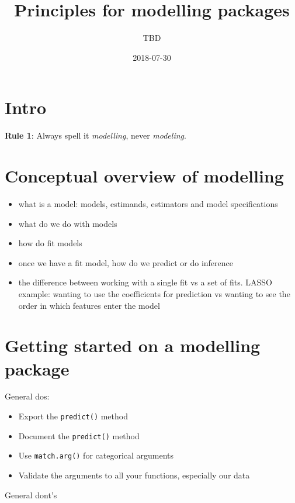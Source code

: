 \documentclass[]{book}
\title{Principles for modelling packages}
\author{TBD}
\date{2018-07-30}
\providecommand{\tightlist}{%
  \setlength{\itemsep}{0pt}\setlength{\parskip}{0pt}}
\theoremstyle{definition}
\theoremstyle{definition}
\theoremstyle{definition}
\theoremstyle{remark}
\begin{document}
\maketitle

{
\setcounter{tocdepth}{1}
\tableofcontents
}
\chapter{Intro}\label{intro}

\textbf{Rule 1}: Always spell it \emph{modelling}, never
\emph{modeling}.

\chapter{Conceptual overview of
modelling}\label{conceptual-overview-of-modelling}

\begin{itemize}
\item
  what is a model: models, estimands, estimators and model
  specifications
\item
  what do we do with models
\item
  how do fit models
\item
  once we have a fit model, how do we predict or do inference
\item
  the difference between working with a single fit vs a set of fits.
  LASSO example: wanting to use the coefficients for prediction vs
  wanting to see the order in which features enter the model
\end{itemize}

\chapter{Getting started on a modelling
package}\label{getting-started-on-a-modelling-package}

General dos:

\begin{itemize}
\tightlist
\item
  Export the \texttt{predict()} method
\item
  Document the \texttt{predict()} method
\item
  Use \texttt{match.arg()} for categorical arguments
\item
  Validate the arguments to all your functions, especially our data
\end{itemize}

General dont's
\end{document}
